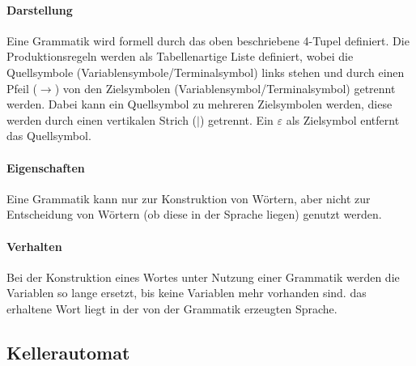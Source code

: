 \documentclass[a4paper, 11pt, accentcolor = tud3b]{tudreport}
\begin{document}
            \paragraph{Darstellung}
                Eine Grammatik wird formell durch das oben beschriebene 4-Tupel definiert. Die Produktionsregeln werden als Tabellenartige Liste definiert, wobei die Quellsymbole (Variablensymbole/Terminalsymbol) links stehen und durch einen Pfeil ($ \rightarrow $) von den Zielsymbolen (Variablensymbol/Terminalsymbol) getrennt werden. Dabei kann ein Quellsymbol zu mehreren Zielsymbolen werden, diese werden durch einen vertikalen Strich ($ | $) getrennt. Ein $ \varepsilon $ als Zielsymbol entfernt das Quellsymbol.

            \paragraph{Eigenschaften}
                Eine Grammatik kann nur zur Konstruktion von Wörtern, aber nicht zur Entscheidung von Wörtern (ob diese in der Sprache liegen) genutzt werden.

            \paragraph{Verhalten}
                Bei der Konstruktion eines Wortes unter Nutzung einer Grammatik werden die Variablen so lange ersetzt, bis keine Variablen mehr vorhanden sind. das erhaltene Wort liegt in der von der Grammatik erzeugten Sprache.


        \subsection{Kellerautomat}
\end{document}
